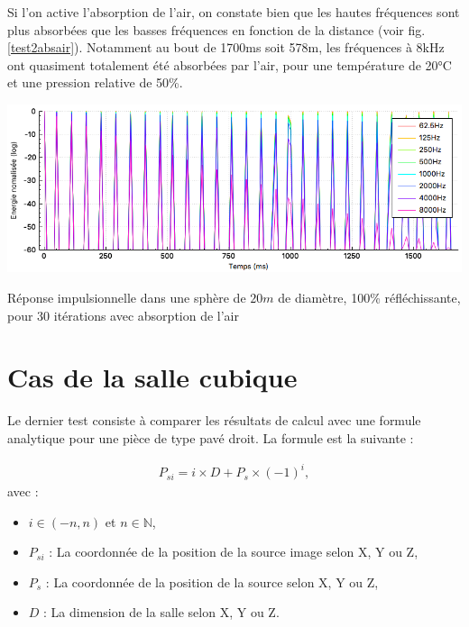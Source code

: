 Si l'on active l'absorption de l'air, on constate bien que les hautes fréquences sont plus absorbées que les basses fréquences en fonction de la distance (voir fig. \ref{test2absair}). Notamment au bout de 1700ms soit 578m, les fréquences à 8kHz ont quasiment totalement été absorbées par l'air, pour une température de 20°C et une pression relative de 50\%.


\begin{figureth}
	\includegraphics[width=\linewidth]{images/test2absair}
	\caption{Réponse impulsionnelle dans une sphère de $20m$ de diamètre, 100\% réfléchissante, pour 30 itérations avec absorption de l'air}
	\label{test2absair}
\end{figureth}



\section{Cas de la salle cubique}

Le dernier test consiste à comparer les résultats de calcul avec une formule analytique pour une pièce de type pavé droit. La formule \cite[p. 182-189]{mcgovern} est la suivante : 

%

\begin{align}
P_{si} = i \times D + P_s \times (-1)^i,
\end{align}
avec : 
\begin{itemize}
\item$i \in (-n, n)$ et $n \in \mathbb{N}$,
\item$P_{si}$ : La coordonnée de la position de la source image selon X, Y ou Z,
\item$P_s$ : La coordonnée de la position de la source selon X, Y ou Z,
\item$D$ : La dimension de la salle selon X, Y ou Z.
\end{itemize}

